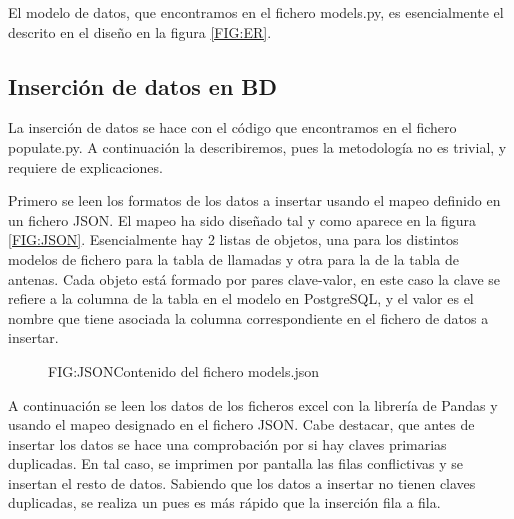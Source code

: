       El modelo de datos, que encontramos en el fichero models.py, es esencialmente el descrito en el diseño en la figura \ref{FIG:ER}.
    
    
    \subsection{Inserción de datos en BD\label{SS:IDAT}}
      La inserción de datos se hace con el código que encontramos en el fichero populate.py. A continuación la describiremos, pues la metodología no es trivial, y requiere de explicaciones.
      
      Primero se leen los formatos de los datos a insertar usando el mapeo definido en un fichero JSON.
      El mapeo ha sido diseñado tal y como aparece en la figura \ref{FIG:JSON}. Esencialmente hay 2 listas de objetos, una para los distintos modelos de fichero para la tabla de llamadas y otra para la de la tabla de antenas.
      Cada objeto está formado por pares clave-valor, en este caso la clave se refiere a la columna de la tabla en el modelo en PostgreSQL, y el valor es el nombre que tiene asociada la columna correspondiente en el fichero de datos a insertar.
      
      \begin{figure}[Contenido del fichero models.json]{FIG:JSON}{Contenido del fichero models.json}
      \end{figure}
    
      A continuación se leen los datos de los ficheros excel con la librería de Pandas y usando el mapeo designado en el fichero JSON.
      Cabe destacar, que antes de insertar los datos se hace una comprobación por si hay claves primarias duplicadas. En tal caso, se imprimen por pantalla las filas conflictivas y se insertan el resto de datos.
      Sabiendo que los datos a insertar no tienen claves duplicadas, se realiza un  pues es más rápido que la inserción fila a fila.
